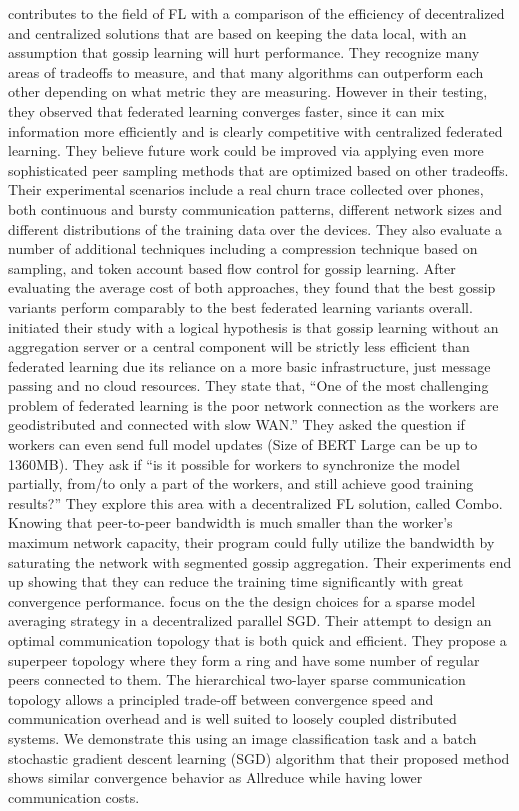 \documentclass[10pt,twocolumn,letterpaper]{article}
\theoremstyle{definition}
\begin{document}
\cite{hegedHus2021decentralized} contributes to the field of FL with a comparison of the efficiency of decentralized and centralized solutions that are based on keeping the data local, with an assumption that gossip learning will hurt performance.  They recognize many areas of tradeoffs to measure, and that many algorithms can outperform each other depending on what metric they are measuring.  However in their testing, they observed that federated learning converges faster, since it can mix information more efficiently and is clearly competitive with centralized federated learning.  They believe future work could be improved via applying even more sophisticated peer sampling methods that are optimized  based on other tradeoffs.
Their experimental scenarios include a real churn trace collected over phones, both continuous and bursty communication patterns, different network sizes and different distributions of the training data over the devices. They also evaluate a number of additional techniques including a compression technique based on sampling, and token account based flow control for gossip learning. After evaluating the average cost of both approaches, they found that the best gossip variants perform comparably to the best federated learning variants overall. %
\cite{hu2019decentralized} initiated their study with a logical hypothesis is that gossip learning without an aggregation server or a central component will be strictly less efficient than federated learning due its reliance on a more basic infrastructure, just message passing and no cloud resources.  They state that, “One of the most challenging problem of federated learning is the poor network connection as the workers are geodistributed and connected with slow WAN.”  They asked the question if workers can even send full model updates (Size of BERT Large can be up to 1360MB).  They ask if “is it possible for workers to synchronize the model partially, from/to only a part of the workers, and still achieve good training results?” They explore this area with a decentralized FL solution, called Combo. Knowing that peer-to-peer bandwidth is much smaller than the worker’s maximum network capacity, their program could fully utilize the bandwidth by saturating the network with segmented gossip aggregation. Their experiments end up showing that they can reduce the training time significantly with great convergence performance. %
\cite{jameel2019ring} focus on the the design choices for a sparse model averaging strategy in a decentralized parallel SGD. Their attempt to design an optimal communication topology that is both quick and efficient.  They propose a superpeer topology where they form a ring and have some number of regular peers connected to them. The hierarchical two-layer sparse communication topology allows a principled trade-off between convergence speed and communication overhead and is well suited to loosely coupled distributed systems. We demonstrate this using an image classification task and a batch stochastic gradient descent learning (SGD) algorithm that their proposed method shows similar convergence behavior as Allreduce while having lower communication costs.  %
\end{document}
